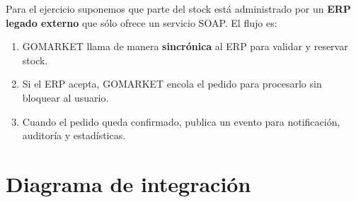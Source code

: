 \documentclass[11pt,a4paper]{article}
\begin{document}
Para el ejercicio suponemos que parte del stock está administrado por un
\textbf{ERP legado externo} que sólo ofrece un servicio SOAP. El flujo es:

\begin{enumerate}
  \item GOMARKET llama de manera \textbf{sincrónica} al ERP para validar y reservar stock.
  \item Si el ERP acepta, GOMARKET encola el pedido para procesarlo sin bloquear al usuario.
  \item Cuando el pedido queda confirmado, publica un evento para notificación,
        auditoría y estadísticas.
\end{enumerate}

\section{Diagrama de integración}
\end{document}
